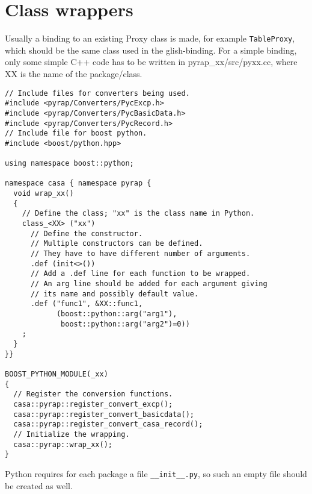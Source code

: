 \section{Class wrappers}
Usually a binding to an existing Proxy class is made, for example
\texttt{TableProxy}, which should be the same class used in the
glish-binding. 
For a simple binding, only some simple C++ code has to be written in
pyrap\_xx/src/pyxx.cc, where XX is the name of the package/class.
\begin{verbatim}
// Include files for converters being used.
#include <pyrap/Converters/PycExcp.h>
#include <pyrap/Converters/PycBasicData.h>
#include <pyrap/Converters/PycRecord.h>
// Include file for boost python.
#include <boost/python.hpp>

using namespace boost::python;

namespace casa { namespace pyrap {
  void wrap_xx()
  {
    // Define the class; "xx" is the class name in Python.
    class_<XX> ("xx")
      // Define the constructor.
      // Multiple constructors can be defined.
      // They have to have different number of arguments.
      .def (init<>())
      // Add a .def line for each function to be wrapped.
      // An arg line should be added for each argument giving
      // its name and possibly default value.
      .def ("func1", &XX::func1,
            (boost::python::arg("arg1"),
             boost::python::arg("arg2")=0))
    ;
  }
}}

BOOST_PYTHON_MODULE(_xx)
{
  // Register the conversion functions.
  casa::pyrap::register_convert_excp();
  casa::pyrap::register_convert_basicdata();
  casa::pyrap::register_convert_casa_record();
  // Initialize the wrapping.
  casa::pyrap::wrap_xx();
}
\end{verbatim}
Python requires for each package a file \texttt{\_\_init\_\_.py},
so such an empty file should be created as well.

